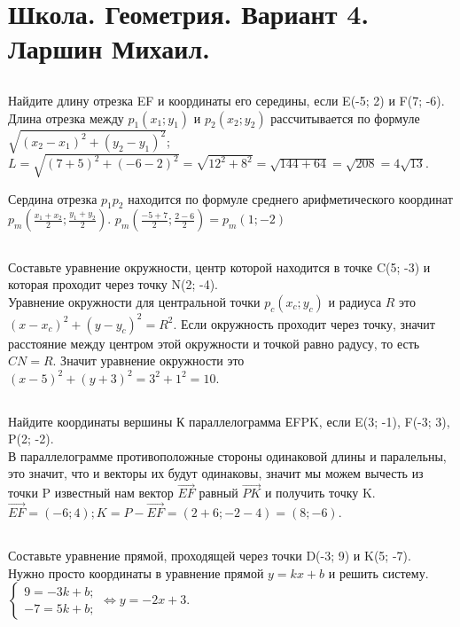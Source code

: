 \documentclass[a4paper,12pt]{article} %
\begin{document}
	\newpage
	\section{Школа. Геометрия. Вариант 4.\\Ларшин Михаил. }
	
	\subsection{}{Найдите длину отрезка EF и координаты его середины, если E(-5; 2) и F(7; -6).\\
		
		Длина отрезка между $p_1(x_1;y_1)$ и $p_2(x_2;y_2)$ рассчитывается по формуле $\sqrt{(x_2-x_1)^2+(y_2-y_1)^2}$; $L = \sqrt{(7+5)^2+(-6-2)^2} = \sqrt{12^2+8^2} = \sqrt{144+64} = \sqrt{208} = 4\sqrt{13}$.
		
		Сердина отрезка $p_1p_2$ находится по формуле среднего арифметического координат $p_m(\frac{x_1+x_2}{2};\frac{y_1+y_2}{2})$. $p_m(\frac{-5+7}{2};\frac{2-6}{2}) = p_m(1;-2)$
	}
	
	\subsection{}{Составьте уравнение окружности, центр которой находится в точке C(5; -3) и которая проходит через точку N(2; -4).\\
		
		Уравнение окружности для центральной точки $p_c(x_c;y_c)$ и радиуса $R$ это $(x-x_c)^2 + (y-y_c)^2=R^2$. Если окружность проходит через точку, значит расстояние между центром этой окружности и точкой равно радусу, то есть $CN = R$. Значит уравнение окружности это $(x-5)^2+(y+3)^2=3^2+1^2=10$.
	}
	
	\subsection{}{Найдите координаты вершины К параллелограмма ЕFPK, если E(3; -1), F(-3; 3), P(2; -2).\\
		
		В параллелограмме противоположные стороны одинаковой длины и паралельны, это значит, что и векторы их будут одинаковы, значит мы можем вычесть из точки P известный нам вектор $\vec{EF}$ равный $\vec{PK}$ и получить точку K. $\vec{EF} = (-6; 4); K = P - \vec{EF} = (2+6; -2-4) = (8; -6)$.
	}
	\newpage
	\subsection{}{Составьте уравнение прямой, проходящей через точки D(-3; 9) и K(5; -7).\\
		
		Нужно просто координаты в уравнение прямой $y = kx + b$ и решить систему.\\
		$\begin{cases}
			9 = -3k + b;\\
			-7 = 5k + b;
		\end{cases} \Leftrightarrow y = -2x + 3$.
	}
	
\end{document}

